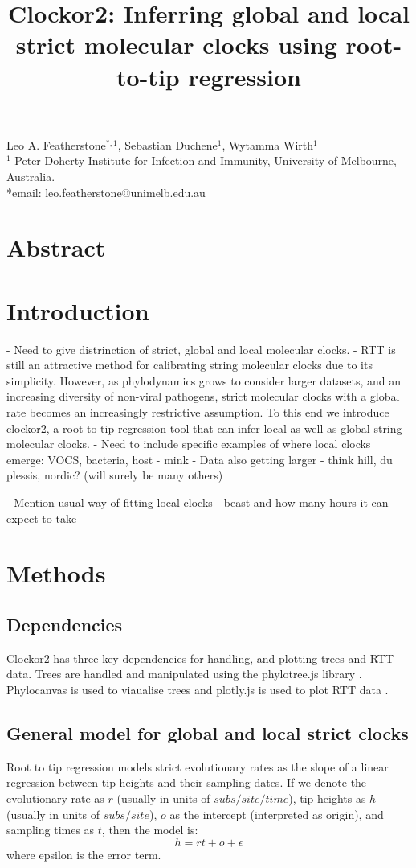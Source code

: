 \documentclass{article}
\title{Clockor2:  Inferring global and local strict molecular clocks using root-to-tip regression}
\begin{document}
\maketitle
\begin{centering}
Leo A. Featherstone$^{\ast,1}$, Sebastian Duchene$^1$, Wytamma Wirth$^{1}$\\
$^{1}$ Peter Doherty Institute for Infection and Immunity, University of Melbourne, Australia.\\
*email: leo.featherstone@unimelb.edu.au
\end{centering}

\section*{Abstract}


\section*{Introduction}
- Need to give distrinction of strict, global and local molecular clocks.
- RTT is still an attractive method for calibrating string molecular clocks due to its simplicity. However, as phylodynamics grows to consider larger datasets, and an increasing diversity of non-viral pathogens, strict molecular clocks with a global rate becomes an increasingly restrictive assumption. To this end we introduce clockor2, a root-to-tip regression tool that  can infer local as well as global string molecular clocks.
- Need to include specific examples of where local clocks emerge: VOCS, bacteria, host - mink
- Data also getting larger - think hill, du plessis, nordic? (will surely be many others)

- Mention usual way of fitting local clocks - beast and how many hours it can expect to take

\section*{Methods}
\subsection*{Dependencies}
Clockor2 has three key dependencies for handling, and plotting trees and RTT data. Trees are handled and manipulated using the phylotree.js library \citep{shank_phylotreejs_2018}. Phylocanvas is used to viaualise trees and plotly.js is used to plot RTT data \citep{abudahab_phylocanvasgl_2021}.

\subsection*{General model for global and local strict clocks}
Root to tip regression models strict evolutionary rates as the slope of a linear regression between tip heights and their sampling dates. If we denote the evolutionary rate as $r$ (usually in units of $subs/site/time$), tip heights as $h$ (usually in units of $subs/site$), $o$ as the intercept (interpreted as origin), and sampling times as $t$, then the model is:
\begin{equation*}
    h = rt + o + \epsilon
\end{equation*}
where epsilon is the error term.
\end{document}
